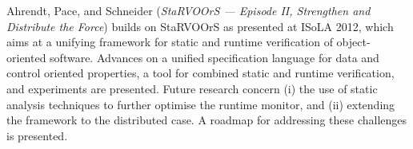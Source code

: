 

Ahrendt, Pace, and Schneider
\cite{isola-2016-ahrendt}
({\em StaRVOOrS — Episode II, Strengthen and Distribute the Force})
builds on StaRVOOrS as presented at ISoLA 2012, which aims at a unifying framework for static and runtime verification of object-oriented software. 
Advances on a unified
specification language for data and control oriented properties, a
tool for combined static and runtime verification, and experiments are
presented. Future research concern (i) the use of static analysis techniques to further optimise the runtime monitor, and (ii) extending the framework to the distributed case. A roadmap for addressing these challenges is presented.

